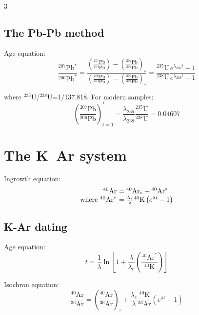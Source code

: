 \documentclass{article}
\begin{document}
\begin{multicols}{3}
\subsection{The Pb-Pb method}
\label{sec:Pb-Pb}

Age equation:
\begin{equation}
\frac{^{207}\mbox{Pb}^*}{^{206}\mbox{Pb}^*} = 
\frac{\left(\frac{^{207}\mbox{Pb}}{^{204}\mbox{Pb}}\right)-\left(\frac{^{207}\mbox{Pb}}{^{204}\mbox{Pb}}\right)_\circ}
{\left(\frac{^{206}\mbox{Pb}}{^{204}\mbox{Pb}}\right)-\left(\frac{^{206}\mbox{Pb}}{^{204}\mbox{Pb}}\right)_\circ}
= \frac{{}^{235}\mbox{U}}{{}^{238}\mbox{U}} \frac{e^{\lambda_{235}t}-1}{e^{\lambda_{238}t}-1}
\label{eq:PbPb}
\end{equation}

where $^{235}$U/$^{238}$U=1/137.818. For modern samples:
\begin{equation}
  \left(\frac{^{207}\mbox{Pb}}{^{206}\mbox{Pb}}\right)^*_{t=0} =
  \frac{\lambda_{235}}{\lambda_{238}}\frac{^{235}\mbox{U}}{^{238}\mbox{U}} = 0.04607
\label{eq:commonPb}
\end{equation}

\section{The K--Ar system}
\label{sec:K-Ar}

Ingrowth equation:
\begin{equation}
\begin{array}{r@{~}l}
^{40}\mbox{Ar} & = {}^{40}\mbox{Ar}_\circ + {}^{40}\mbox{Ar}^*\\ 
\mbox{where~} {}^{40}\mbox{Ar}^* & =
  \frac{\lambda_e}{\lambda} {}^{40}\mbox{K} \left( e^{\lambda t} - 1 \right)
\end{array}
\label{eq:Ar}
\end{equation}

\subsection{K-Ar dating}

Age equation:
\begin{equation}
t = \frac{1}{\lambda} \ln\left[ 1 + \frac{\lambda}{\lambda_e}
  \left(\frac{^{40}\mbox{Ar}^*}{^{40}\mbox{K}}\right) \right]
\label{eq:K-Ar}
\end{equation}

Isochron equation:
\begin{equation}
\frac{^{40}\mbox{Ar}}{^{36}\mbox{Ar}} = \left(\frac{^{40}\mbox{Ar}}{^{36}\mbox{Ar}}\right)_\circ +
\frac{\lambda_e}{\lambda} \frac{^{40}\mbox{K}}{^{36}\mbox{Ar}} \left( e^{\lambda t} - 1 \right)
\label{eq:K-Ar-isochron}
\end{equation}


\end{multicols}
\end{document}
